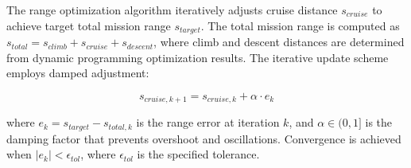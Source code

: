 The range optimization algorithm iteratively adjusts cruise distance $s_{cruise}$ to achieve target total mission range $s_{target}$. The total mission range is computed as $s_{total} = s_{climb} + s_{cruise} + s_{descent}$, where climb and descent distances are determined from dynamic programming optimization results. The iterative update scheme employs damped adjustment:

\begin{equation}
s_{cruise,k+1} = s_{cruise,k} + \alpha \cdot e_k
\end{equation}

where $e_k = s_{target} - s_{total,k}$ is the range error at iteration $k$, and $\alpha \in (0,1]$ is the damping factor that prevents overshoot and oscillations. Convergence is achieved when $|e_k| < \epsilon_{tol}$, where $\epsilon_{tol}$ is the specified tolerance.